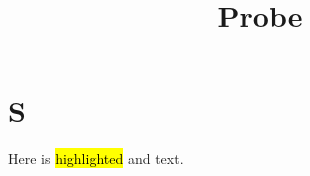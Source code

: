 \documentclass{article}
\title{Probe}
\begin{document}
\section{S}
Here is \hl{highlighted} and  text.
\end{document}
